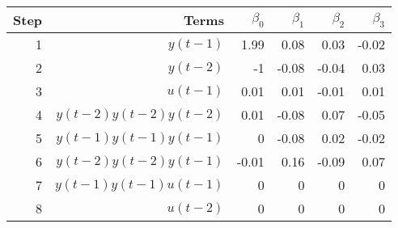 \begin{tabular}{rrrrrr}
Step & Terms & $\beta_{0}$ & $\beta_{1}$ & $\beta_{2}$ & $\beta_{3}$ \\ 
\hline 
1 & $y(t-1)$ & 1.99 & 0.08 & 0.03 & -0.02 \\ 
2 & $y(t-2)$ & -1 & -0.08 & -0.04 & 0.03 \\ 
3 & $u(t-1)$ & 0.01 & 0.01 & -0.01 & 0.01 \\ 
4 & $y(t-2)y(t-2)y(t-2)$ & 0.01 & -0.08 & 0.07 & -0.05 \\ 
5 & $y(t-1)y(t-1)y(t-1)$ & 0 & -0.08 & 0.02 & -0.02 \\ 
6 & $y(t-2)y(t-2)y(t-1)$ & -0.01 & 0.16 & -0.09 & 0.07 \\ 
7 & $y(t-1)y(t-1)u(t-1)$ & 0 & 0 & 0 & 0 \\ 
8 & $u(t-2)$ & 0 & 0 & 0 & 0 \\ 
\hline 
\end{tabular}